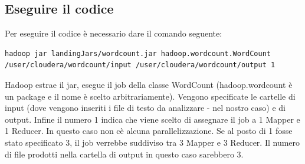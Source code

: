 \documentclass[italian,10pt,a4paper]{report}
\begin{document}
		\subsection{Eseguire il codice}
		Per eseguire il codice è necessario dare il comando seguente:
		\begin{lstlisting}[style=bash]
			hadoop jar landingJars/wordcount.jar hadoop.wordcount.WordCount /user/cloudera/wordcount/input /user/cloudera/wordcount/output 1
		\end{lstlisting}
		Hadoop estrae il jar, esegue il job della classe WordCount (hadoop.wordcount è un package e il nome è scelto arbitrariamente). Vengono specificate le cartelle di input (dove vengono inseriti i file di testo da analizzare - nel nostro caso) e di output. Infine il numero 1 indica che viene scelto di assegnare il job a 1 Mapper e 1 Reducer. In questo caso non cè alcuna parallelizzazione. Se al posto di 1 fosse stato specificato 3, il job verrebbe suddiviso tra 3 Mapper e 3 Reducer. Il numero di file prodotti nella cartella di output in questo caso sarebbero 3.
\end{document}
